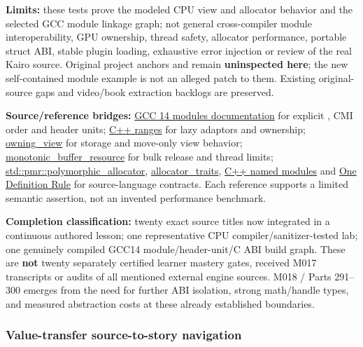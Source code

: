 \textbf{Limits:} these tests prove the modeled CPU view and allocator behavior and the selected GCC module linkage graph; not general cross-compiler module interoperability, GPU ownership, thread safety, allocator performance, portable struct ABI, stable plugin loading, exhaustive error injection or review of the real Kairo source. Original project anchors  and  remain \textbf{uninspected here}; the new self-contained module example is not an alleged patch to them. Existing original-source gaps and video/book extraction backlogs are preserved.

\textbf{Source/reference bridges:} \href{https://gcc.gnu.org/onlinedocs/gcc-14.3.0/gcc/C_002b_002b-Modules.html}{GCC 14 modules documentation} for explicit , CMI order and header units; \href{https://en.cppreference.com/cpp/ranges}{C++ ranges} for lazy adaptors and ownership; \href{https://en.cppreference.com/cpp/ranges/owning_view}{owning\_view} for storage and move-only view behavior; \href{https://en.cppreference.com/cpp/memory/monotonic_buffer_resource}{monotonic\_buffer\_resource} for bulk release and thread limits; \href{https://en.cppreference.com/w/cpp/memory/polymorphic_allocator}{std::pmr::polymorphic\_allocator}, \href{https://en.cppreference.com/w/cpp/memory/allocator_traits}{allocator\_traits}, \href{https://en.cppreference.com/w/cpp/language/modules}{C++ named modules} and \href{https://en.cppreference.com/w/cpp/language/definition}{One Definition Rule} for source-language contracts. Each reference supports a limited semantic assertion, not an invented performance benchmark.

\textbf{Completion classification:} twenty exact source titles now integrated in a continuous authored lesson; one representative CPU compiler/sanitizer-tested lab; one genuinely compiled GCC14 module/header-unit/C ABI build graph. These are \textbf{not} twenty separately certified learner mastery gates, received M017 transcripts or audits of all mentioned external engine sources. M018 / Parts 291--300 emerges from the need for further ABI isolation, strong math/handle types, and measured abstraction costs at these already established boundaries.

\subsubsection{Value-transfer source-to-story navigation}\label{appendix-fd090d982a15-value-transfer-source-to-story-navigation}

